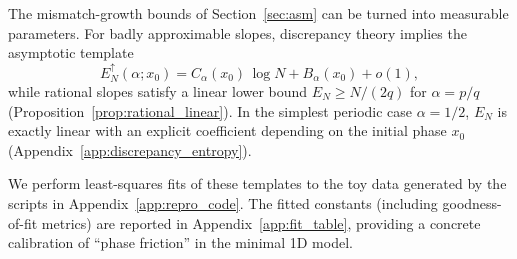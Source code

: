 The mismatch-growth bounds of Section~\ref{sec:asm} can be turned into measurable parameters. For badly approximable slopes, discrepancy theory implies the asymptotic template
\begin{equation}
  E_N^{\uparrow}(\alpha;x_0) = C_\alpha(x_0)\,\log N + B_\alpha(x_0) + o(1),
\end{equation}
while rational slopes satisfy a linear lower bound $E_N\ge N/(2q)$ for $\alpha=p/q$ (Proposition~\ref{prop:rational_linear}). In the simplest periodic case $\alpha=1/2$, $E_N$ is exactly linear with an explicit coefficient depending on the initial phase $x_0$ (Appendix~\ref{app:discrepancy_entropy}).

We perform least-squares fits of these templates to the toy data generated by the scripts in Appendix~\ref{app:repro_code}. The fitted constants (including goodness-of-fit metrics) are reported in Appendix~\ref{app:fit_table}, providing a concrete calibration of ``phase friction'' in the minimal 1D model.


